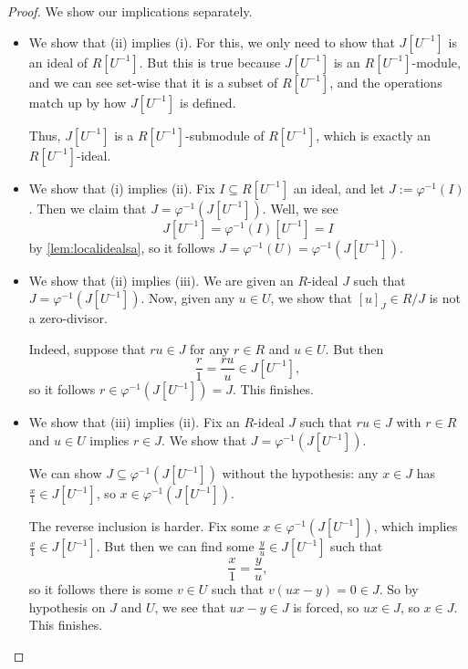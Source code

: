 \begin{proof}
	We show our implications separately.
	\begin{itemize}
		\item We show that (ii) implies (i). For this, we only need to show that $J\left[U^{-1}\right]$ is an ideal of $R\left[U^{-1}\right]$. But this is true because $J\left[U^{-1}\right]$ is an $R\left[U^{-1}\right]$-module, and we can see set-wise that it is a subset of $R\left[U^{-1}\right]$, and the operations match up by how $J\left[U^{-1}\right]$ is defined.

		Thus, $J\left[U^{-1}\right]$ is a $R\left[U^{-1}\right]$-submodule of $R\left[U^{-1}\right]$, which is exactly an $R\left[U^{-1}\right]$-ideal.

		\item We show that (i) implies (ii). Fix $I\subseteq R\left[U^{-1}\right]$ an ideal, and let $J:=\varphi^{-1}(I)$. Then we claim that $J=\varphi^{-1}\left(J\left[U^{-1}\right]\right)$. Well, we see
		\[J\left[U^{-1}\right]=\varphi^{-1}(I)\left[U^{-1}\right]=I\]
		by \autoref{lem:localidealsa}, so it follows $J=\varphi^{-1}(U)=\varphi^{-1}\left(J\left[U^{-1}\right]\right)$.

		\item We show that (ii) implies (iii). We are given an $R$-ideal $J$ such that $J=\varphi^{-1}\left(J\left[U^{-1}\right]\right)$. Now, given any $u\in U$, we show that $[u]_J\in R/J$ is not a zero-divisor.
		
		Indeed, suppose that $ru\in J$ for any $r\in R$ and $u\in U$. But then
		\[\frac r1=\frac{ru}u\in J\left[U^{-1}\right],\]
		so it follows $r\in\varphi^{-1}\left(J\left[U^{-1}\right]\right)=J$. This finishes.

		\item We show that (iii) implies (ii). Fix an $R$-ideal $J$ such that $ru\in J$ with $r\in R$ and $u\in U$ implies $r\in J$. We show that $J=\varphi^{-1}\left(J\left[U^{-1}\right]\right)$.

		We can show $J\subseteq\varphi^{-1}\left(J\left[U^{-1}\right]\right)$ without the hypothesis: any $x\in J$ has $\frac x1\in J\left[U^{-1}\right]$, so $x\in\varphi^{-1}\left(J\left[U^{-1}\right]\right)$.

		The reverse inclusion is harder. Fix some $x\in\varphi^{-1}\left(J\left[U^{-1}\right]\right)$, which implies $\frac x1\in J\left[U^{-1}\right]$. But then we can find some $\frac yu\in J\left[U^{-1}\right]$ such that
		\[\frac x1=\frac yu,\]
		so it follows there is some $v\in U$ such that $v(ux-y)=0\in J$. So by hypothesis on $J$ and $U$, we see that $ux-y\in J$ is forced, so $ux\in J$, so $x\in J$. This finishes.
		\qedhere
	\end{itemize}
\end{proof}
